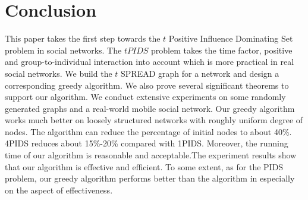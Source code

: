\section{Conclusion}
This paper takes the first step towards the $t$ Positive Influence Dominating Set problem in social networks.
The $tPIDS$ problem takes the time factor, positive and group-to-individual interaction into account which is more practical in real social networks.
We build the $t$ SPREAD graph for a network and design a corresponding greedy algorithm. We also prove several significant theorems to support our algorithm.
We conduct extensive experiments on some randomly generated graphs and a real-world mobile social network. Our greedy algorithm works much better on loosely structured networks with roughly uniform degree of nodes.
The algorithm can reduce the percentage of initial nodes to about 40\%. 4PIDS reduces about 15\%-20\% compared with 1PIDS. Moreover, the running time of our algorithm is reasonable and acceptable.The experiment results show that our algorithm is effective and efficient. To some extent, as for the PIDS problem, our greedy algorithm performs better than the algorithm in \cite{WDC2011} especially on the aspect of effectiveness.

%
%




